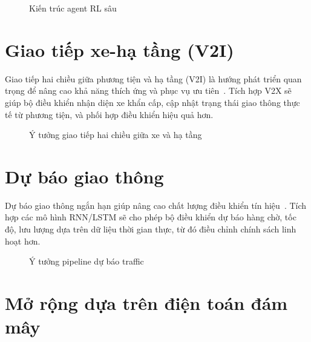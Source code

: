 \begin{figure}[H]
    \centering
    \caption{Kiến trúc agent RL sâu}
\end{figure}

\section{Giao tiếp xe-hạ tầng (V2I)}

Giao tiếp hai chiều giữa phương tiện và hạ tầng (V2I) là hướng phát triển quan trọng để nâng cao khả năng thích ứng và phục vụ ưu tiên~\cite{Michailidis2023,Chamberlain2017}. Tích hợp V2X sẽ giúp bộ điều khiển nhận diện xe khẩn cấp, cập nhật trạng thái giao thông thực tế từ phương tiện, và phối hợp điều khiển hiệu quả hơn.

\begin{figure}[H]
    \centering
    \caption{Ý tưởng giao tiếp hai chiều giữa xe và hạ tầng}
\end{figure}

\section{Dự báo giao thông}

Dự báo giao thông ngắn hạn giúp nâng cao chất lượng điều khiển tín hiệu~\cite{Li2016,Wei2019,Zhao2020,Lopez2018}. Tích hợp các mô hình RNN/LSTM sẽ cho phép bộ điều khiển dự báo hàng chờ, tốc độ, lưu lượng dựa trên dữ liệu thời gian thực, từ đó điều chỉnh chính sách linh hoạt hơn.

\begin{figure}[H]
    \centering
    \caption{Ý tưởng pipeline dự báo traffic}
\end{figure}

\section{Mở rộng dựa trên điện toán đám mây}

